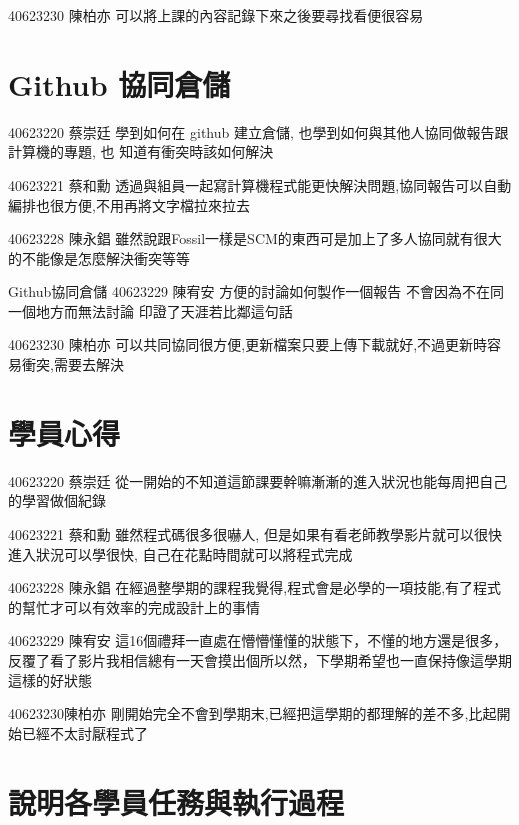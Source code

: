 \documentclass[12pt,,]{report}
\begin{document}
40623230 陳柏亦 可以將上課的內容記錄下來之後要尋找看便很容易

\hypertarget{github-ux5354ux540cux5009ux5132}{%
\section{Github 協同倉儲}\label{github-ux5354ux540cux5009ux5132}}

40623220 蔡崇廷 學到如何在 github 建立倉儲,
也學到如何與其他人協同做報告跟計算機的專題, 也 知道有衝突時該如何解決

40623221 蔡和勳
透過與組員一起寫計算機程式能更快解決問題,協同報告可以自動編排也很方便,不用再將文字檔拉來拉去

40623228 陳永錩
雖然說跟Fossil一樣是SCM的東西可是加上了多人協同就有很大的不能像是怎麼解決衝突等等

Github協同倉儲 40623229 陳宥安 方便的討論如何製作一個報告
不會因為不在同一個地方而無法討論 印證了天涯若比鄰這句話

40623230 陳柏亦
可以共同協同很方便,更新檔案只要上傳下載就好,不過更新時容易衝突,需要去解決

\hypertarget{ux5b78ux54e1ux5fc3ux5f97}{%
\section{學員心得}\label{ux5b78ux54e1ux5fc3ux5f97}}

40623220 蔡崇廷
從一開始的不知道這節課要幹嘛漸漸的進入狀況也能每周把自己的學習做個紀錄

40623221 蔡和勳 雖然程式碼很多很嚇人,
但是如果有看老師教學影片就可以很快進入狀況可以學很快,
自己在花點時間就可以將程式完成

40623228 陳永錩
在經過整學期的課程我覺得,程式會是必學的一項技能,有了程式的幫忙才可以有效率的完成設計上的事情

40623229 陳宥安
這16個禮拜一直處在懵懵懂懂的狀態下，不懂的地方還是很多，反覆了看了影片我相信總有一天會摸出個所以然，下學期希望也一直保持像這學期這樣的好狀態

40623230陳柏亦
剛開始完全不會到學期末,已經把這學期的都理解的差不多,比起開始已經不太討厭程式了

\hypertarget{ux8aaaux660eux5404ux5b78ux54e1ux4efbux52d9ux8207ux57f7ux884cux904eux7a0b}{%
\section{說明各學員任務與執行過程}\label{ux8aaaux660eux5404ux5b78ux54e1ux4efbux52d9ux8207ux57f7ux884cux904eux7a0b}}
\end{document}

